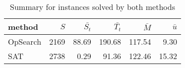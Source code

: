 \begin{table}[htbp]
\centering
\begin{tabular}{lrrrrr}
  \hline
method & $S$ & $\bar{S_t}$ & $\bar{T_t}$ & $\bar{M}$ & $\bar{u}$ \\ 
  \hline
OpSearch & 2169 & 88.69 & 190.68 & 117.54 & 9.30 \\ 
  SAT & 2738 & 0.29 & 91.36 & 122.46 & 15.32 \\ 
   \hline
\end{tabular}
\caption{Summary for instances solved by both methods} 
\label{tab:summary_both}
\end{table}
